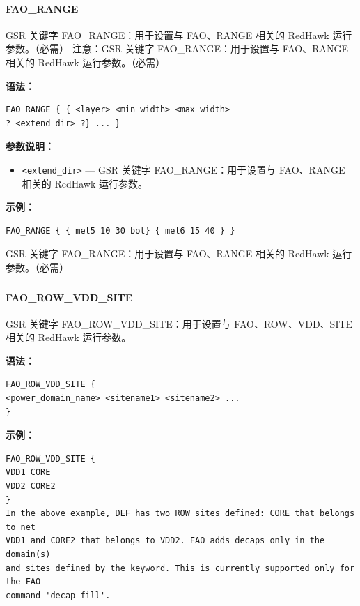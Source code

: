 \paragraph*{FAO_RANGE}

GSR 关键字 FAO_RANGE：用于设置与 FAO、RANGE 相关的 RedHawk 运行参数。（必需） 注意：GSR 关键字 FAO_RANGE：用于设置与 FAO、RANGE 相关的 RedHawk 运行参数。（必需）

\textbf{语法：}
\begin{lstlisting}
FAO_RANGE { { <layer> <min_width> <max_width>
? <extend_dir> ?} ... }
\end{lstlisting}

\textbf{参数说明：}
\begin{itemize}
\item \texttt{<extend\_dir>} — GSR 关键字 FAO\_RANGE：用于设置与 FAO、RANGE 相关的 RedHawk 运行参数。
\end{itemize}

\textbf{示例：}
\begin{lstlisting}
FAO_RANGE { { met5 10 30 bot} { met6 15 40 } }
\end{lstlisting}

\begin{noteBox}
GSR 关键字 FAO\_RANGE：用于设置与 FAO、RANGE 相关的 RedHawk 运行参数。（必需）
\end{noteBox}

\subsubsection{}
\paragraph*{FAO_ROW_VDD_SITE}

GSR 关键字 FAO_ROW_VDD_SITE：用于设置与 FAO、ROW、VDD、SITE 相关的 RedHawk 运行参数。

\textbf{语法：}
\begin{lstlisting}
FAO_ROW_VDD_SITE {
<power_domain_name> <sitename1> <sitename2> ...
}
\end{lstlisting}

\textbf{示例：}
\begin{lstlisting}
FAO_ROW_VDD_SITE {
VDD1 CORE
VDD2 CORE2
}
In the above example, DEF has two ROW sites defined: CORE that belongs to net
VDD1 and CORE2 that belongs to VDD2. FAO adds decaps only in the domain(s)
and sites defined by the keyword. This is currently supported only for the FAO
command 'decap fill'.
\end{lstlisting}


